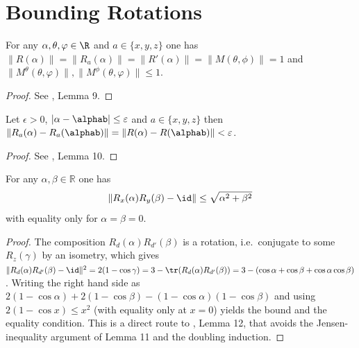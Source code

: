 \chapter{Bounding Rotations}

\begin{lemma} \label{lem:RaRalpha}
\leanok
For any $\alpha, \theta,\varphi \in \R$ and $a \in \{x,y,z\}$ one has $\| R(\alpha)\| = \| R_a(\alpha)\| = \| R'(\alpha) \| =\| M(\theta, \phi)\| = 1$ and $\| M^\theta(\theta,\varphi)\|, \| M^\phi(\theta,\varphi)\| \leq 1$.
\end{lemma}
\begin{proof}
\leanok
See \cite{polyhedron.without.rupert}, Lemma 9.
\end{proof}

\begin{lemma} \label{lem:RaRa}
  \leanok
Let $\epsilon>0$, $|\alpha-\alphab|\leq\varepsilon$ and $a \in \{x,y,z\}$ then
$\|R_a(\alpha)-R_a({\alphab})\|=\|R(\alpha)-R(\alphab)\| < \varepsilon$.
\end{lemma}
\begin{proof}
\leanok
See \cite{polyhedron.without.rupert}, Lemma 10.
\end{proof}



\begin{lemma} \label{lem:RxRy}
\leanok
For any $\alpha,\beta\in \mathbb{R}$ one has
\[
    \|R_x(\alpha)R_y(\beta)-\id\| \leq  \sqrt{\alpha^2+\beta^2}
\]
with equality only for $\alpha = \beta = 0$.
\end{lemma}

\begin{proof}
\leanok
The composition $R_d(\alpha)R_{d'}(\beta)$ is a rotation, i.e.\ conjugate
to some $R_z(\gamma)$ by an isometry, which gives
$\|R_d(\alpha)R_{d'}(\beta)-\id\|^2 = 2(1-\cos\gamma)
= 3 - \tr(R_d(\alpha)R_{d'}(\beta))
= 3 - (\cos\alpha + \cos\beta + \cos\alpha\cos\beta)$.
Writing the right hand side as
$2(1-\cos\alpha) + 2(1-\cos\beta) - (1-\cos\alpha)(1-\cos\beta)$
and using $2(1-\cos x) \leq x^2$ (with equality only at $x = 0$)
yields the bound and the equality condition.
This is a direct route to \cite{polyhedron.without.rupert}, Lemma 12,
that avoids the Jensen-inequality argument of Lemma 11 and the
doubling induction.
\end{proof}

